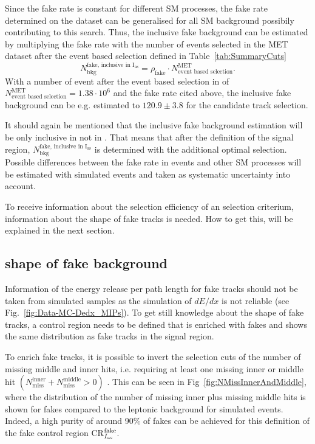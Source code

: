 Since the fake rate is constant for different SM processes, the fake rate determined on the \Zlep dataset can be generalised for all SM background possibily contributing to this search.
Thus, the inclusive fake background can be estimated by multiplying the fake rate with the number of events selected in the MET dataset after the event based selection defined in Table~\ref{tab:SummaryCuts}
\begin{equation*}
N^{\text{fake, inclusive in I$_{\text{as}}$}}_{\text{bkg}} = \rho_{\text{fake}} \cdot N_{\text{event based selection}}^{\text{MET}}.
\end{equation*}
With a number of event after the event based selection in of $N_{\text{event based selection}}^{\text{MET}} = 1.38\cdot10^6$ and the fake rate cited above, 
the inclusive fake background can be e.g. estimated to $120.9\pm3.8$ for the candidate track selection.

It should again be mentioned that the inclusive fake background estimation will be only inclusive in \ias not in \pt.
That means that after the definition of the signal region, $N^{\text{fake, inclusive in I$_{\text{as}}$}}_{\text{bkg}}$ is determined with the additional optimal \pt selection.
Possible differences between the fake rate in \Zlep events and other SM processes will be estimated with simulated events and taken as systematic uncertainty into account.

To receive information about the selection efficiency of an \ias selection criterium, information about the \ias shape of fake tracks is needed.
How to get this, will be explained in the next section.

\subsection*{\ias shape of fake background}
Information of the energy release per path length for fake tracks should not be taken from simulated samples as the simulation of $dE/dx$ is not reliable (see Fig.~\ref{fig:Data-MC-Dedx_MIPs}).
To get still knowledge about the \ias shape of fake tracks, a control region needs to be defined that is enriched with fakes and shows the same \ias distribution as fake tracks in the signal region.

To enrich fake tracks, it is possible to invert the selection cuts of the number of missing middle and inner hits, i.e. requiring at least one missing inner or middle hit $\left( N_{\text{miss}}^{\text{inner}} +N_{\text{miss}}^{\text{middle}}>0\right)$ .
This can be seen in Fig~\ref{fig:NMissInnerAndMiddle}, where the distribution of the number of missing inner plus missing middle hits is shown for fakes compared to the leptonic background for simulated \WJets events.
Indeed, a high purity of around 90\% of fakes can be achieved for this definition of the \ias fake control region CR$_{I_{\text{as}}}^{\text{fake}}$.


